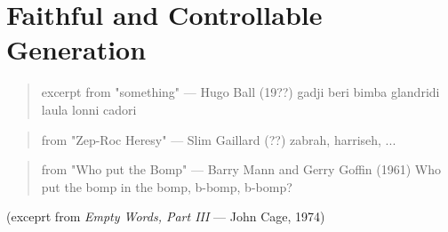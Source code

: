 \chapter{Faithful and Controllable Generation}
\label{gen}


\begin{quote}{excerpt from "something" --- Hugo Ball (19??)}
gadji beri bimba glandridi laula lonni cadori 
\end{quote}

\begin{quote}{from "Zep-Roc Heresy" --- Slim Gaillard (??)}
zabrah, harriseh, ... 
\end{quote}

\begin{quote}{from "Who put the Bomp" --- Barry Mann and Gerry Goffin (1961)}
    Who put the bomp in the bomp, b-bomp, b-bomp?
\end{quote}




\begin{singlespace}
\end{singlespace}
\par\nobreak\smallskip\hfill(exceprt from \textit{Empty Words, Part III} --- John Cage, 1974)%
~\\








